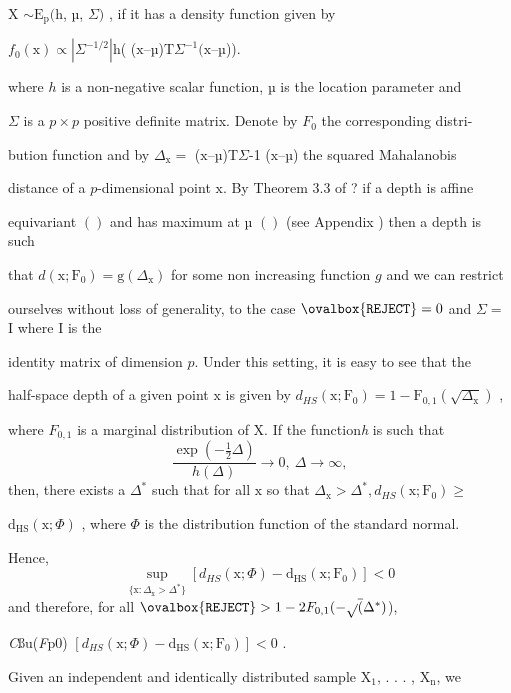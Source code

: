 \documentclass[a4paper,12pt]{article}
\begin{document}
X $\sim \mathrm{E}_{\mathrm{p}} (\mathrm{h}$, µ, $\Sigma)$ , if it has a density function given by
\begin{center}
$f_{0}(\mathrm{x})\propto|\Sigma^{-1/2}|\mathrm{h}$( ($\mathrm{x}$--µ)$\mathrm{T} \Sigma^{-1}(\mathrm{x}$--µ)).
\end{center}
where $h$ is a non-negative scalar function, µ is the location parameter and

$\Sigma$ is a $p\times p$ positive definite matrix. Denote by $F_{0}$ the corresponding distri-

bution function and by $\Delta_{\mathrm{x}}=$ ($\mathrm{x}$--µ)T$\Sigma$-1 ($\mathrm{x}$--µ) the squared Mahalanobis

distance of a $p$-dimensional point $\mathrm{x}$. By Theorem 3.3 of ? if a depth is affine

equivariant $()$ and has maximum at µ $()$ (see Appendix ) then a depth is such

that $d(\mathrm{x};\mathrm{F}_{0})=\mathrm{g}(\Delta_{\mathrm{x}})$ for some non increasing function $g$ and we can restrict

ourselves without loss of generality, to the case $\ovalbox{\tt\small REJECT}=0$ and $\Sigma=$ I where I is the

identity matrix of dimension $p$. Under this setting, it is easy to see that the

half-space depth of a given point $\mathrm{x}$ is given by $d_{HS}(\mathrm{x};\mathrm{F}_{0})=1-\mathrm{F}_{0,1}(\sqrt{\Delta_{\mathrm{x}}})$ ,

where $F_{0,1}$ is a marginal distribution of X. If the function{\it h} is such that
$$
\frac{\exp(-\frac{1}{2}\Delta)}{h(\Delta)}\rightarrow 0,\ \Delta\rightarrow\infty,
$$
then, there exists a $\Delta^{*}$ such that for all $\mathrm{x}$ so that $\Delta_{\mathrm{x}} > \Delta^{*}, d_{HS}(\mathrm{x};\mathrm{F}_{0}) \geq$

$\mathrm{d}_{\mathrm{H}\mathrm{S}}(\mathrm{x};\Phi)$ , where $\Phi$ is the distribution function of the standard normal.

Hence,
$$
\sup_{\{\mathrm{x}:\Delta_{\mathrm{x}}>\Delta^{*}\}}[d_{HS}(\mathrm{x};\Phi)-\mathrm{d}_{\mathrm{H}\mathrm{S}}(\mathrm{x};\mathrm{F}_{0})]<0
$$
and therefore, for all $\ovalbox{\tt\small REJECT}> 1-2F_{0,1}(-\sqrt{}\overline{(}\Delta^{*})$),

{\it C}ßu({\it F}p0) $[d_{HS}(\mathrm{x};\Phi)-\mathrm{d}_{\mathrm{H}\mathrm{S}}(\mathrm{x};\mathrm{F}_{0})] <0$ .

Given an independent and identically distributed sample $\mathrm{X}_{1}$, . . . , $\mathrm{X}_{\mathrm{n}}$, we
\end{document}
